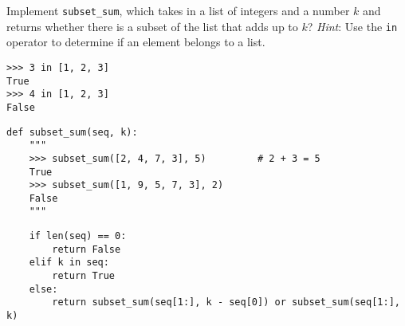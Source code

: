 \begin{blocksection}
\question Implement \lstinline$subset_sum$, which takes in a list of integers and
a number $k$ and returns whether there is a subset of the list that adds up to
$k$? \emph{Hint}: Use the \lstinline$in$ operator to determine if an element
belongs to a list.

\begin{lstlisting}
>>> 3 in [1, 2, 3]
True
>>> 4 in [1, 2, 3]
False
\end{lstlisting}

\begin{lstlisting}
def subset_sum(seq, k):
    """
    >>> subset_sum([2, 4, 7, 3], 5)         # 2 + 3 = 5
    True
    >>> subset_sum([1, 9, 5, 7, 3], 2)
    False
    """
\end{lstlisting}

\begin{solution}[1.5in]
\begin{lstlisting}
    if len(seq) == 0:
        return False
    elif k in seq:
        return True
    else:
        return subset_sum(seq[1:], k - seq[0]) or subset_sum(seq[1:], k)
\end{lstlisting}
\end{solution}
\end{blocksection}
